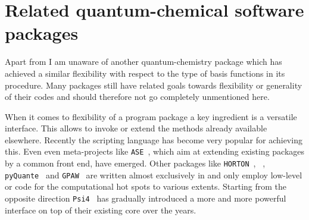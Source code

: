 \section{Related quantum-chemical software packages}
\label{sec:MolsturmRelated}
\newcommand{\psifour}{\texttt{Psi4}\xspace}
\newcommand{\pyquante}{\texttt{pyQuante}\xspace}
\newcommand{\horton}{\texttt{HORTON}\xspace}
\newcommand{\gpaw}{\texttt{GPAW}\xspace}
\newcommand{\ASE}{\texttt{ASE}\xspace}
\newcommand{\CPtK}{\texttt{CP2K}\xspace}

Apart from \molsturm I am unaware of another quantum-chemistry package
which has achieved
a similar flexibility with respect to the type of basis functions
in its \SCF procedure.
Many packages still have related goals towards flexibility or generality of their codes
and should therefore not go completely unmentioned here.

When it comes to flexibility of a program package
a key ingredient is a versatile interface.
This allows to invoke or extend the methods already available elsewhere.
Recently the scripting language \python has become very popular
for achieving this.
Even even meta-projects like \ASE~\cite{Larsen2017},
which aim at extending existing packages by a common \python front end,
have emerged.
Other packages like \horton~\cite{Verstraelen2017}, \pyscf~\cite{Sun2017},
\pyquante~\cite{PyQuante} and \gpaw~\cite{Mortensen2005,Enkovaara2010} are written
almost exclusively in \python and only employ low-level \ccc or \cpp
code for the computational hot spots to various extents.
Starting from the opposite direction \psifour~\cite{Parrish2017} has
gradually introduced a more and more powerful \python interface on top of
their existing \cpp core over the years.

